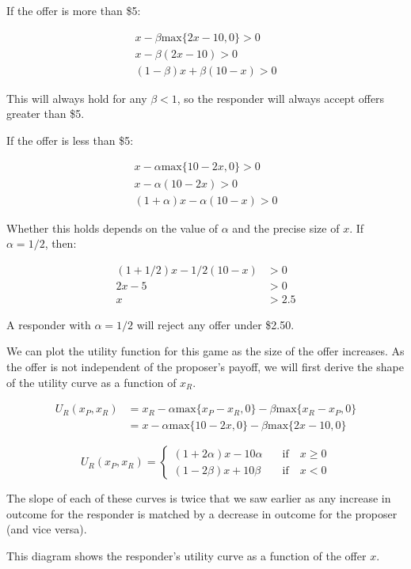\documentclass[
  letterpaper,
  DIV=11,
  numbers=noendperiod]{scrreprt}
\begin{document}
If the offer is more than \$5:

\begin{align*}
x−\beta\text{max}\{2𝑥−10, 0\}>0 \\[6pt]
x−\beta(2x−10)>0 \\[6pt]
(1−\beta)x+\beta(10−x)>0
\end{align*}

This will always hold for any \(\beta<1\), so the responder will always
accept offers greater than \$5.

If the offer is less than \$5:

\begin{align*}
x−\alpha\text{max}\{10−2x,0\}>0 \\
x−\alpha(10−2x)>0 \\
(1+\alpha)x−\alpha(10−𝑥)>0
\end{align*}

Whether this holds depends on the value of \(\alpha\) and the precise
size of \(x\). If \(\alpha=1/2\), then:

\begin{align*}
(1+1/2)x−1/2 (10−x)&>0 \\
2x−5&>0 \\
x&>2.5
\end{align*}

A responder with \(\alpha=1/2\) will reject any offer under \$2.50.

We can plot the utility function for this game as the size of the offer
increases. As the offer is not independent of the proposer's payoff, we
will first derive the shape of the utility curve as a function of
\(x_R\).

\begin{align*}
U_R(x_P,x_R)&=x_R-\alpha\text{max}\{x_P-x_R,0\}-\beta\text{max}\{x_R-x_P,0\} \\
&=x-\alpha\text{max}\{10-2x,0\}-\beta\text{max}\{2x-10,0\}
\end{align*}

\[
U_R(x_P,x_R)=\left\{\begin{matrix}
(1+2\alpha)x−10\alpha \quad &\textrm{if} \quad x \geq 0 \\[6pt]
(1−2\beta)x+10\beta \quad &\textrm{if} \quad x < 0 
\end{matrix}\right.
\]

The slope of each of these curves is twice that we saw earlier as any
increase in outcome for the responder is matched by a decrease in
outcome for the proposer (and vice versa).

This diagram shows the responder's utility curve as a function of the
offer \(x\).
\end{document}
